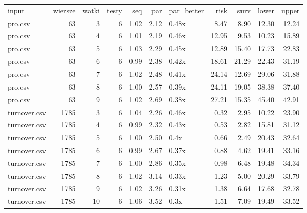 \begin{table}[ht]
\centering
\begin{tabular}{lrrrrrlrrrr}
 input & wiersze & watki & testy & seq & par & par\_better & risk & surv & lower & upper \\ 
 pro.csv &  63 &   3 &   6 & 1.02 & 2.12 & 0.48x & 8.47 & 8.90 & 12.30 & 12.24 \\ 
   \hline
pro.csv &  63 &   4 &   6 & 1.01 & 2.19 & 0.46x & 12.95 & 9.53 & 10.23 & 15.89 \\ 
   \hline
pro.csv &  63 &   5 &   6 & 1.03 & 2.29 & 0.45x & 12.89 & 15.40 & 17.73 & 22.83 \\ 
   \hline
pro.csv &  63 &   6 &   6 & 0.99 & 2.38 & 0.42x & 18.61 & 21.29 & 22.43 & 31.19 \\ 
   \hline
pro.csv &  63 &   7 &   6 & 1.02 & 2.48 & 0.41x & 24.14 & 12.69 & 29.06 & 31.88 \\ 
   \hline
pro.csv &  63 &   8 &   6 & 1.00 & 2.57 & 0.39x & 24.11 & 19.05 & 38.38 & 37.40 \\ 
   \hline
pro.csv &  63 &   9 &   6 & 1.02 & 2.69 & 0.38x & 27.21 & 15.35 & 45.40 & 42.91 \\ 
   \hline
turnover.csv & 1785 &   3 &   6 & 1.04 & 2.26 & 0.46x & 0.32 & 2.95 & 10.22 & 23.90 \\ 
   \hline
turnover.csv & 1785 &   4 &   6 & 0.99 & 2.32 & 0.43x & 0.53 & 2.82 & 15.81 & 31.12 \\ 
   \hline
turnover.csv & 1785 &   5 &   6 & 1.00 & 2.50 & 0.4x & 0.66 & 2.49 & 20.43 & 32.64 \\ 
   \hline
turnover.csv & 1785 &   6 &   6 & 0.99 & 2.67 & 0.37x & 0.88 & 4.62 & 19.41 & 33.16 \\ 
   \hline
turnover.csv & 1785 &   7 &   6 & 1.00 & 2.86 & 0.35x & 0.98 & 6.48 & 19.48 & 34.34 \\ 
   \hline
turnover.csv & 1785 &   8 &   6 & 1.02 & 3.14 & 0.33x & 1.23 & 5.00 & 20.29 & 33.79 \\ 
   \hline
turnover.csv & 1785 &   9 &   6 & 1.02 & 3.26 & 0.31x & 1.38 & 6.64 & 17.68 & 32.78 \\ 
   \hline
turnover.csv & 1785 &  10 &   6 & 1.06 & 3.52 & 0.3x & 1.51 & 7.09 & 19.49 & 33.52 \\ 
   \hline
\end{tabular}
\end{table}
